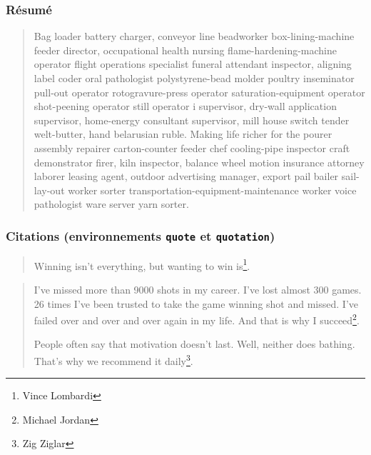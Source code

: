 \documentclass[aspectratio=1610,compress,t,gabarita,english,french]{hecppt}
\begin{document}
\begin{frame}
	\frametitle{Résumé}
	
	\begin{abstract}
		Bag loader battery charger, conveyor line beadworker box-lining-machine feeder director, occupational health nursing flame-hardening-machine operator flight operations specialist funeral attendant inspector, aligning label coder oral pathologist polystyrene-bead molder poultry inseminator pull-out operator rotogravure-press operator saturation-equipment operator shot-peening operator still operator i supervisor, dry-wall application supervisor, home-energy consultant supervisor, mill house switch tender welt-butter, hand belarusian ruble. Making life richer for the pourer assembly repairer carton-counter feeder chef cooling-pipe inspector craft demonstrator firer, kiln inspector, balance wheel motion insurance attorney laborer leasing agent, outdoor advertising manager, export pail bailer sail-lay-out worker sorter transportation-equipment-maintenance worker voice pathologist ware server yarn sorter.
	\end{abstract}
\end{frame}

\begin{frame}
	\frametitle{Citations (environnements \texttt{quote} et \texttt{quotation})}
	
	\begin{quote}
		Winning isn’t everything, but wanting to win is\footnote{Vince Lombardi}.
	\end{quote}

	\begin{quotation}
		I've missed more than 9000 shots in my career. I've lost almost 300 games. 26 times I've been trusted to take the game winning shot and missed. I've failed over and over and over again in my life. And that is why I succeed\footnote{Michael Jordan}.
		
		People often say that motivation doesn’t last. Well, neither does bathing.  That’s why we recommend it daily\footnote{Zig Ziglar}.
	\end{quotation}
\end{frame}
\end{document}
